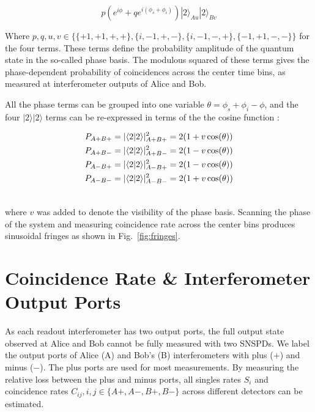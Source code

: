 \documentclass[11pt]{caltech_thesis} %
\begin{document}
$$p\left(e^{i \phi}+qe^{i\left(\phi_s+\phi_i\right)}\right)|2\rangle_{Au}|2\rangle_{Bv} $$

Where $p, q, u, v \in \{\{+1,+1, +, +\}, \{i,-1, +, -\}, \{i,-1, -, +\}, \{-1,+1, -, -\}\}$ for the four terms. These terms define the probability amplitude of the quantum state in the so-called phase basis. The modulous squared of these terms gives the phase-dependent probability of coincidences across the center time bins, as measured at interferometer outputs of Alice and Bob.

All the phase terms can be grouped into one variable $\theta = \phi_s + \phi_i - \phi$, and the four $|2\rangle|2\rangle$ terms can be re-expressed in terms of the the cosine function \autocite{Marcikic2002,Kim2022}:

\hypertarget{eq:cosines}{}{ 
\begin{align}
P_{A+ B+} &= |\langle 2|2\rangle|^2_{A+ B+} = 2(1 + v \cos(\theta)) \\
P_{A+ B-} &= |\langle 2|2\rangle|^2_{A+ B-} = 2(1 - v \cos(\theta)) \notag \\
P_{A- B+} &= |\langle 2|2\rangle|^2_{A- B+} = 2(1 - v \cos(\theta)) \notag \\
P_{A- B-} &= |\langle 2|2\rangle|^2_{A- B-} = 2(1 + v \cos(\theta)) \notag \\ \notag
\end{align}
}\label{eq:cosines}

where $v$ was added to denote the visibility of the phase basis. Scanning the phase of the system and measuring coincidence rate across the center bins produces sinusoidal fringes as shown in Fig.~\ref{fig:fringes}.

\hypertarget{coincidence-rate-interferometer-output-ports}{%
\section{Coincidence Rate \& Interferometer Output Ports}\label{coincidence-rate-interferometer-output-ports}}

As each readout interferometer has two output ports, the full output state observed at Alice and Bob cannot be fully measured with two SNSPDs. We label the output ports of Alice (A) and Bob's (B) interferometers with plus ($+$) and minus ($-$). The plus ports are used for most measurements. By measuring the relative loss between the plus and minus ports, all singles rates $S_i$ and coincidence rates $C_{ij}, i,j \in \{A+, A-, B+, B-\}$ across different detectors can be estimated.
\end{document}
